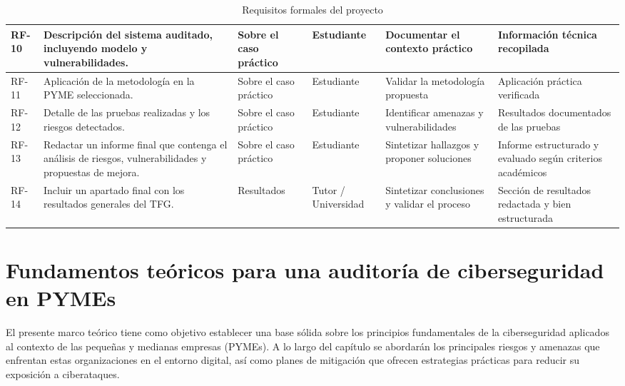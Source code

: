 \documentclass[a4paper, 11pt]{article}
\begin{document}
\begin{landscape}
\begin{table}
\begin{tabular}{|p{1cm}|p{6cm}|p{2.5cm}|p{2.7cm}|p{3.2cm}|p{4.9cm}|}
\hline
RF-10 & Descripción del sistema auditado, incluyendo modelo y vulnerabilidades. & Sobre el caso práctico & Estudiante & Documentar el contexto práctico & Información técnica recopilada \\
\hline
RF-11 & Aplicación de la metodología en la PYME seleccionada. & Sobre el caso práctico & Estudiante & Validar la metodología propuesta & Aplicación práctica verificada \\
\hline
RF-12 & Detalle de las pruebas realizadas y los riesgos detectados. & Sobre el caso práctico & Estudiante & Identificar amenazas y vulnerabilidades & Resultados documentados de las pruebas \\
\hline
RF-13 & Redactar un informe final que contenga el análisis de riesgos, vulnerabilidades y propuestas de mejora. & Sobre el caso práctico & Estudiante & Sintetizar hallazgos y proponer soluciones & Informe estructurado y evaluado según criterios académicos \\
\hline
RF-14 & Incluir un apartado final con los resultados generales del TFG. & Resultados & Tutor / Universidad & Sintetizar conclusiones y validar el proceso & Sección de resultados redactada y bien estructurada \\
\hline
\end{tabular}
\caption{Requisitos formales del proyecto}
\label{tab:requisitos_formales}
\vspace{0.2cm}
\end{table}
\end{landscape}







\clearpage
\thispagestyle{nohead}



\section{Fundamentos teóricos para una auditoría de ciberseguridad en PYMEs}
\par\vspace{0.5cm}


El presente marco teórico tiene como objetivo establecer una base sólida sobre los principios fundamentales de la ciberseguridad aplicados al contexto de las pequeñas y medianas empresas (PYMEs). A lo largo del capítulo se abordarán los principales riesgos y amenazas que enfrentan estas organizaciones en el entorno digital, así como planes de mitigación que ofrecen estrategias prácticas para reducir su exposición a ciberataques.
\end{document}
